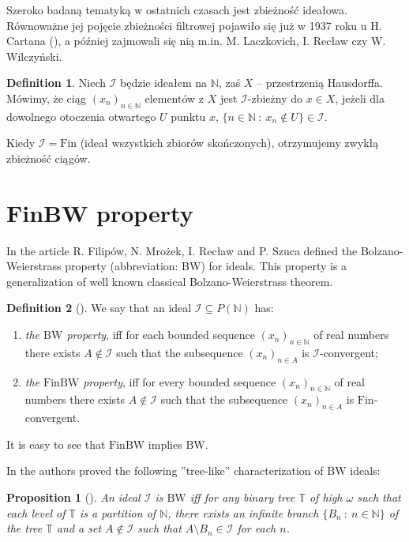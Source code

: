 \documentclass{amsart}
\newtheorem{prop}{Proposition}
\theoremstyle{definition}
\newtheorem{df}{Definition}
\theoremstyle{definition}
\newcommand{\N}{{\mathbb N}}
\newcommand{\Fin}{\textrm{Fin}}
\newcommand{\I}{\mathcal I}
\newcommand{\bw}{\text{BW}}
\newcommand{\finbw}{\text{FinBW}}
\begin{document}
Szeroko badaną tematyką w ostatnich czasach jest zbieżność ideałowa. Równoważne jej pojęcie zbieżności filtrowej pojawiło się już w 1937 roku u H. Cartana (\cite{cartan}), a później zajmowali się nią m.in. M. Laczkovich, I. Recław czy W. Wilczyński.  
\begin{df}
Niech $\I$ będzie ideałem na $\N$, zaś $X$ -- przestrzenią Hausdorffa. Mówimy, że ciąg $(x_n)_{n\in\N}$ elementów z $X$ jest $\I$-zbieżny do $x\in X$, jeżeli dla dowolnego otoczenia otwartego $U$ punktu $x$, $\{n\in \N\ :\ x_n\not\in U  \}\in\I$. %
\end{df}
Kiedy $\I=\Fin$ (ideał wszystkich zbiorów skończonych), otrzymujemy zwykłą zbieżność ciągów.


\color{black}
\section{FinBW property}

In the article \cite{H1} R. Filipów, N. Mrożek, I. Recław and P. Szuca 
defined the Bolzano-Weierstrass property (abbreviation: BW) 
for ideals. This property is a generalization
of well known classical Bolzano-Weierstrass theorem.

\begin{df}[\cite{H1}]
We say that an ideal $\I \subseteq P(\N)$ has:
\begin{enumerate}
\item \emph{the $\bw$ property}, 
iff for each bounded sequence $(x_n)_{n\in\N}$ 
of real numbers there exists $A\notin\I$ 
such that the subsequence $(x_n)_{n\in A}$ is $\I$-convergent;
\item \emph{the $\finbw$ property}, iff for every bounded sequence
$(x_n)_{n\in\N}$ of real numbers there exists $A\notin\I$ 
such that the subsequence $(x_n)_{n\in A}$ is $\Fin$-convergent.
\end{enumerate}
\end{df}
It is easy to see that $\finbw$ implies $\bw$.

In \cite{H1} the authors proved the following ''tree-like'' 
characterization of $\bw$ ideals:
\begin{prop}[\cite{H1}]
An ideal $\I$ is $\bw$ iff for any binary tree $\mathbb{T}$ of high $\omega$ 
such that each level of $\mathbb{T}$ is a partition of $\N$, 
there exists an infinite branch $\{B_n \ :\ n\in \N\}$ of the tree
$\mathbb{T}$ and a set $A\notin\I$ such that $A\setminus B_n \in\I$ for each $n$.
\end{prop}
\end{document}
